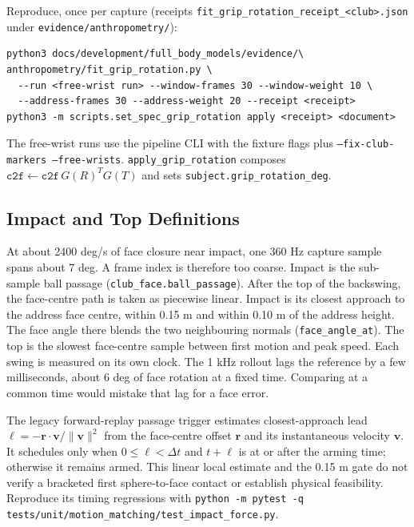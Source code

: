 \documentclass[11pt,a4paper]{article}
\begin{document}
Reproduce, once per capture (receipts \texttt{fit\_grip\_rotation\_receipt\_<club>.json}
under \texttt{evidence/anthropometry/}):
\begin{verbatim}
python3 docs/development/full_body_models/evidence/\
anthropometry/fit_grip_rotation.py \
  --run <free-wrist run> --window-frames 30 --window-weight 10 \
  --address-frames 30 --address-weight 20 --receipt <receipt>
python3 -m scripts.set_spec_grip_rotation apply <receipt> <document>
\end{verbatim}
The free-wrist runs use the pipeline CLI with the fixture flags plus
\texttt{--fix-club-markers --free-wrists}. \texttt{apply\_grip\_rotation} composes
$\texttt{c2f} \leftarrow \texttt{c2f}\,G(R)^{T}G(T)$ and sets \texttt{subject.grip\_rotation\_deg}.

\subsection{Impact and Top Definitions}
At about 2400 deg/s of face closure near impact, one 360 Hz capture sample
spans about 7 deg. A frame index is therefore too coarse. Impact is the
sub-sample ball passage (\texttt{club\_face.ball\_passage}). After the top of
the backswing, the face-centre path is taken as piecewise linear. Impact is
its closest approach to the address face centre, within 0.15 m and within
0.10 m of the address height. The face angle there blends the two
neighbouring normals (\texttt{face\_angle\_at}). The top is the slowest
face-centre sample between first motion and peak speed. Each swing is
measured on its own clock. The 1 kHz rollout lags the reference by a few
milliseconds, about 6 deg of face rotation at a fixed time. Comparing at a
common time would mistake that lag for a face error.

The legacy forward-replay passage trigger estimates closest-approach lead
$\ell=-\mathbf{r}\cdot\mathbf{v}/\lVert\mathbf{v}\rVert^2$ from the face-centre
offset $\mathbf r$ and its instantaneous velocity $\mathbf v$. It schedules
only when $0\leq\ell<\Delta t$ and $t+\ell$ is at or after the arming time;
otherwise it remains armed. This linear local estimate and the 0.15 m gate do
not verify a bracketed first sphere-to-face contact or establish physical
feasibility. Reproduce its timing regressions with
\texttt{python -m pytest -q tests/unit/motion\_matching/test\_impact\_force.py}.
\end{document}
